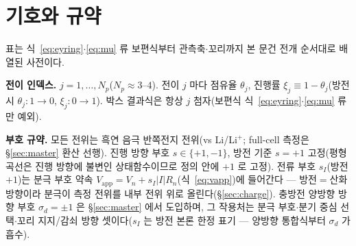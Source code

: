 \documentclass[11pt,a4paper]{article}
\newcommand{\app}{\mathrm{app}}
\begin{document}
\tableofcontents
\newpage

\section{기호와 규약}\label{sec:notation}
표는 식~\eqref{eq:eyring}$\cdot$\eqref{eq:mu} 류 보편식부터 관측축$\cdot$꼬리까지 본 문건 전개 순서대로 배열된 사전이다.

\textbf{전이 인덱스.} $j=1,\dots,N_p$($N_p\approx3\text{--}4$). 전이 $j$ 마다 점유율 $\theta_j$, 진행률 $\xi_j\equiv1-\theta_j$(방전 시 $\theta_j:1\to0$, $\xi_j:0\to1$). 박스 결과식은 항상 $j$ 첨자(보편식 식~\eqref{eq:eyring}$\cdot$\eqref{eq:mu} 류만 예외).

\textbf{부호 규약.} 모든 전위는 흑연 음극 반쪽전지 전위(vs Li/Li$^+$; full-cell 측정은 \S\ref{sec:master} 환산 선행). 진행 방향 부호 $s\in\{+1,-1\}$, 방전 기준 $s=+1$ 고정(평형 곡선은 진행 방향에 불변인 상태함수이므로 정의 안에 $+1$ 로 고정). 전류 부호 $s_I$(방전 $+1$)는 분극 부호 약속 $V_\app=V_n+s_I|I|R_n$(식~\eqref{eq:vapp})에 들어간다 — 방전$=$산화 방향이라 분극이 측정 전위를 내부 전위 위로 올린다(\S\ref{sec:charge}). 충방전 양방향 방향 부호 $\sigma_d=\pm1$ 은 \S\ref{sec:master} 에서 도입하며, 그 작용처는 분극 부호$\cdot$분기 중심 선택$\cdot$꼬리 지지/감쇠 방향 셋이다($s_I$ 는 방전 본론 한정 표기 — 양방향 통합식부터 $\sigma_d$ 가 흡수).
\end{document}
